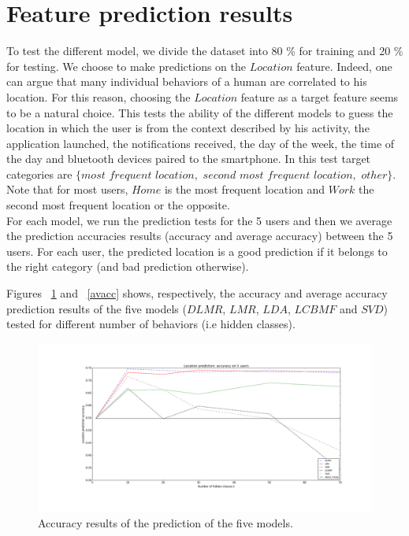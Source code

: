 \section{Feature prediction results}
To test the different model, we divide the dataset into 80 \% for training and 20 \% for testing. We choose to make predictions on the $Location$ feature. Indeed, one can argue that many individual behaviors of a human are correlated to his location. For this reason, choosing the $Location$ feature as a target feature seems to be a natural choice. This tests the ability of the different models to guess the location in which the user is from the context described by his activity, the application launched, the notifications received, the day of the week, the time of the day and bluetooth devices paired to the smartphone. In this test target categories are $\{ $$most$ $frequent$ $location,$ $second$ $most$ $frequent$ $location$$,$ $other$$\}$. 
Note that for most users, $Home$ is the most frequent location and $Work$ the second most frequent location or the opposite.
\\For each model, we run the prediction tests for the 5 users and then we average the prediction accuracies results (accuracy and average accuracy) between the 5 users. For each user, the predicted location is a good prediction if it belongs to the right category (and bad prediction otherwise).

Figures ~\ref{acc} and ~\ref{avacc} shows, respectively, the accuracy and average accuracy prediction results of the five models ($DLMR$, $LMR$, $LDA$, $LCBMF$ and $SVD$) tested for different number of behaviors (i.e hidden classes).

\begin{figure} [!ht]
\centering
\includegraphics[scale=0.3]{Figures/location_accuracy.png}
\caption{Accuracy results of the prediction of the five models.}
\label{acc}
\end{figure}

